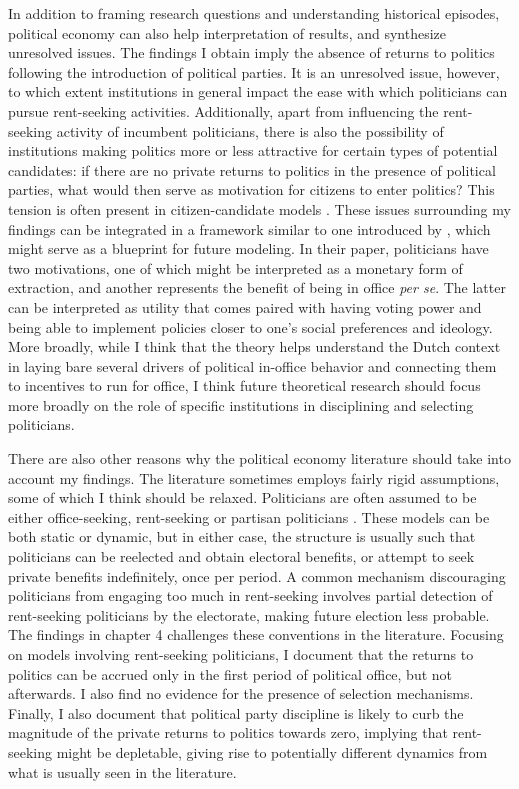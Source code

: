 In addition to framing research questions and understanding historical episodes, political economy can also help interpretation of results, and synthesize unresolved issues. The findings I obtain imply the absence of returns to politics following the introduction of political parties. It is an unresolved issue, however, to which extent institutions in general impact the ease with which politicians can pursue rent-seeking activities. Additionally, apart from influencing the rent-seeking activity of incumbent politicians, there is also the possibility of institutions making politics more or less attractive for certain types of potential candidates: if there are no private returns to politics in the presence of political parties, what would then serve as motivation for citizens to enter politics? This tension is often present in citizen-candidate models \citep[see e.g.][]{besley2005political}. These issues surrounding my findings can be integrated in a framework similar to one introduced by \cite{svaleryd2009political}, which might serve as a blueprint for future modeling. In their paper, politicians have two motivations, one of which might be interpreted as a monetary form of extraction, and another represents the benefit of being in office \textit{per se}. The latter can be interpreted as utility that comes paired with having voting power and being able to implement policies closer to one's social preferences and ideology. More broadly, while I think that the theory helps understand the Dutch context in laying bare several drivers of political in-office behavior and connecting them to incentives to run for office, I think future theoretical research should focus more broadly on the role of specific institutions in disciplining and selecting politicians. 

There are also other reasons why the political economy literature should take into account my findings. The literature sometimes employs fairly rigid assumptions, some of which I think should be relaxed. Politicians are often assumed to be either office-seeking, rent-seeking or partisan politicians \citep{persson2002political}. These models can be both static or dynamic, but in either case, the structure is usually such that politicians can be reelected and obtain electoral benefits, or attempt to seek private benefits indefinitely, once per period. A common mechanism discouraging politicians from engaging too much in rent-seeking involves partial detection of rent-seeking politicians by the electorate, making future election less probable. The findings in chapter 4 challenges these conventions in the literature. Focusing on models involving rent-seeking politicians, I document that the returns to politics can be accrued only in the first period of political office, but not afterwards. I also find no evidence for the presence of selection mechanisms. Finally, I also document that political party discipline is likely to curb the magnitude of the private returns to politics towards zero, implying that rent-seeking might be depletable, giving rise to potentially different dynamics from what is usually seen in the literature.  

